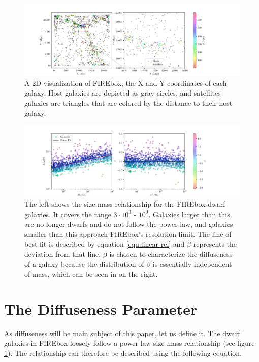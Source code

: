 \begin{figure}
    \centering
    \includegraphics*[width=\textwidth*11/10]{figs/me/locations.pdf}
    \caption*{
        A 2D visualization of FIREbox; the X and Y coordinates of each galaxy. Host galaxies are depicted as gray circles, and satellites galaxies are triangles that are colored by the distance to their host galaxy. 
    }
\end{figure}

\begin{figure}
    \centering
    \includegraphics[width=\textwidth*11/10]{figs/me/stars-mass-size-r50.pdf}
    \caption{
        The left shows the size-mass relationship for the FIREbox dwarf galaxies. It covers the range $3 \cdot 10^3$ - $10^9$. Galaxies larger than this are no longer dwarfs and do not follow the power law, and galaxies smaller than this approach FIREbox's resolution limit. The line of best fit is described by equation \ref{equ:linear-rel} and $\beta$ represents the deviation from that line. $\beta$ is chosen to characterize the diffuseness of a galaxy because the distribution of $\beta$ is essentially independent of mass, which can be seen in on the right.
    }
    \label{fig:size-mass}
\end{figure}

\section{The Diffuseness Parameter}
As diffuseness will be main subject of this paper, let us define it. The dwarf galaxies in FIREbox loosely follow a power law size-mass relationship (see figure \ref{fig:size-mass}). The relationship can therefore be described using the following equation.

